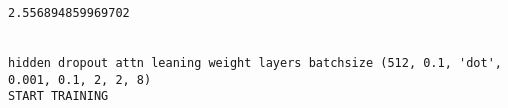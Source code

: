 \documentclass[11pt]{article}
\begin{document}
    \begin{center}
    \end{center}
    { \hspace*{\fill} \\}
    
    \begin{center}
    \end{center}
    { \hspace*{\fill} \\}
    
    \begin{Verbatim}[commandchars=\\\{\}]
2.556894859969702


hidden dropout attn leaning weight layers batchsize (512, 0.1, 'dot', 0.001, 0.1, 2, 2, 8)
START TRAINING



    \end{Verbatim}

    \begin{center}
    \end{center}
    { \hspace*{\fill} \\}
    
    \begin{center}
    \end{center}
    { \hspace*{\fill} \\}
    
    \begin{center}
    \end{center}
    { \hspace*{\fill} \\}
    
    \begin{center}
    \end{center}
    { \hspace*{\fill} \\}
    
    \begin{center}
    \end{center}
    { \hspace*{\fill} \\}
    
\end{document}
